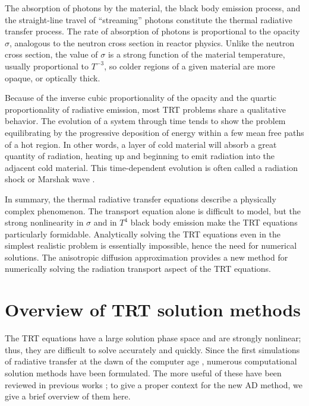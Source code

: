 The absorption of photons by the material, the black body emission process, and
the straight-line travel of ``streaming'' photons constitute the
thermal radiative transfer process. The rate of absorption of photons is
proportional to the opacity $\sigma$, analogous to the neutron cross section in
reactor physics. Unlike the neutron cross section, the value of $\sigma$ is
a strong function of the material temperature, usually proportional to
$T^{-3}$, so colder regions of a given material are more opaque, or optically
thick.

Because of the inverse cubic proportionality of the opacity and the quartic
proportionality of radiative emission, most TRT problems share a qualitative
behavior.  The evolution of a system through time tends to show the problem
equilibrating by the progressive deposition of energy within a few mean free
paths of a hot region.  In other words, a layer of cold material will absorb
a great quantity of radiation, heating up and beginning to emit radiation
into the adjacent cold material. This time-dependent evolution is often called
a radiation shock or Marshak wave \cite{Mar1958}.

In summary, the thermal radiative transfer equations describe a physically
complex phenomenon.  The transport equation alone is difficult to model, but
the strong nonlinearity in $\sigma$ and in $T^4$ black body emission make the
TRT equations particularly formidable.
Analytically solving the TRT equations even in the simplest realistic problem
is essentially impossible, hence the need for numerical solutions.
The anisotropic diffusion approximation provides a new method for numerically
solving the radiation transport aspect of the TRT equations.

\section{Overview of TRT solution methods}

The TRT equations have
a large solution phase space and are strongly nonlinear; thus,
they are difficult to solve accurately and quickly. Since the first
simulations of radiative transfer at the dawn of the computer age
\cite{Cam1964,Cam1969}, numerous computational solution methods have been
formulated.  The more useful of these have been reviewed in previous
works \cite{Cam1964,Cam1969,Ols2000,Bru2002,Cas2004,Wol2008};
to give a proper context for the new AD method, we give a brief overview of
them here.

